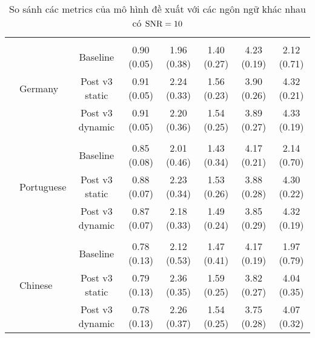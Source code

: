 \begin{sidewaystable}
\begin{subtable}{\textwidth}
\begin{tabular}{llcccccc}
					&&&&&&&\\
					& \multirow{3}{*}{Germany}      &Baseline       & 0.90 (0.05)   & 1.96 (0.38)   & 1.40 (0.27)   & 4.23 (0.19)   & 2.12 (0.71) \\
					&               &Post v3 static & 0.91 (0.05)   & 2.24 (0.33)   & 1.56 (0.23)   & 3.90 (0.26)   & 4.32 (0.21) \\
					&               &Post v3 dynamic        & 0.91 (0.05)   & 2.20 (0.36)   & 1.54 (0.25)   & 3.89 (0.27)   & 4.33 (0.19) \\
					&&&&&&&\\
					& \multirow{3}{*}{Portuguese}   &Baseline       & 0.85 (0.08)   & 2.01 (0.46)   & 1.43 (0.34)   & 4.17 (0.21)   & 2.14 (0.70) \\
					&               &Post v3 static & 0.88 (0.07)   & 2.23 (0.34)   & 1.53 (0.26)   & 3.88 (0.28)   & 4.30 (0.22) \\
					&               &Post v3 dynamic        & 0.87 (0.07)   & 2.18 (0.33)   & 1.49 (0.24)   & 3.85 (0.29)   & 4.32 (0.19) \\
					&&&&&&&\\
					& \multirow{3}{*}{Chinese}      &Baseline       & 0.78 (0.13)   & 2.12 (0.53)   & 1.47 (0.41)   & 4.17 (0.19)   & 1.97 (0.79) \\
					&               &Post v3 static & 0.79 (0.13)   & 2.36 (0.35)   & 1.59 (0.25)   & 3.82 (0.27)   & 4.04 (0.35) \\
					&               &Post v3 dynamic        & 0.78 (0.13)   & 2.26 (0.37)   & 1.54 (0.25)   & 3.75 (0.28)   & 4.07 (0.32) \\
					\hline
				\end{tabular}
				\caption{So sánh các metrics của mô hình đề xuất với các ngôn ngữ khác nhau có $\text{SNR}=10$}
			\end{subtable}
		\end{sidewaystable}
	
		\clearpage
		
